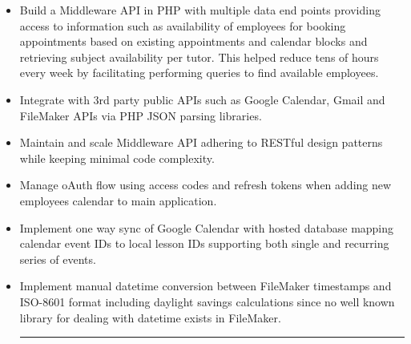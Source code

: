 \documentclass{resume}
\begin{document}
\begin{itemize}
\vspace{4pt}
{\color{dividercolor}\hrule}
\vspace{4pt}

\item \small \raggedright Build a Middleware API in PHP with multiple data end points providing access to information such as availability of employees for booking appointments based on existing appointments and calendar blocks and retrieving subject availability per tutor. This helped reduce tens of hours every week by facilitating performing queries to find available employees.
\item \small \raggedright Integrate with 3rd party public APIs such as Google Calendar, Gmail and FileMaker APIs via PHP JSON parsing libraries.
\item \small \raggedright Maintain and scale Middleware API adhering to RESTful design patterns while keeping minimal code complexity.
\item \small \raggedright Manage oAuth flow using access codes and refresh tokens when adding new employees calendar to main application.
\item \small \raggedright Implement one way sync of Google Calendar with hosted database mapping calendar event IDs to local lesson IDs supporting both single and recurring series of events.
\item \small \raggedright Implement manual datetime conversion between FileMaker timestamps and ISO-8601 format including daylight savings calculations since no well known library for dealing with datetime exists in FileMaker.

\vspace{4pt}
{\color{dividercolor}\hrule}
\vspace{4pt}


\end{itemize}
\end{document}
